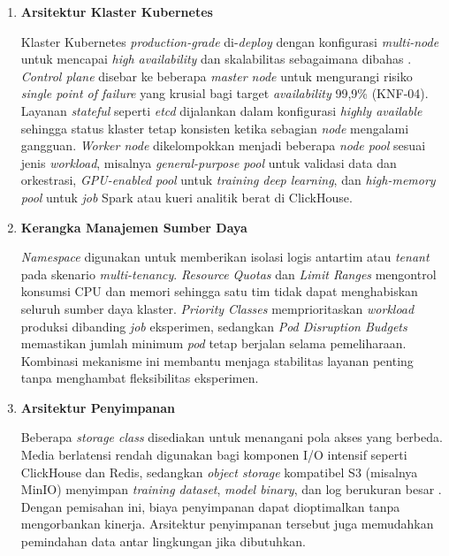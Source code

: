 \vspace{0.5em}
\begin{enumerate}
    \item \textbf{Arsitektur Klaster Kubernetes}  

    Klaster Kubernetes \textit{production-grade} di-\textit{deploy} dengan konfigurasi \textit{multi-node} untuk mencapai \textit{high availability} dan skalabilitas sebagaimana dibahas \textcite{lakka2025kubernetes}. \textit{Control plane} disebar ke beberapa \textit{master node} untuk mengurangi risiko \textit{single point of failure} yang krusial bagi target \textit{availability} 99{,}9\% (KNF-04). Layanan \textit{stateful} seperti \textit{etcd} dijalankan dalam konfigurasi \textit{highly available} sehingga status klaster tetap konsisten ketika sebagian \textit{node} mengalami gangguan. \textit{Worker node} dikelompokkan menjadi beberapa \textit{node pool} sesuai jenis \textit{workload}, misalnya \textit{general-purpose pool} untuk validasi data dan orkestrasi, \textit{GPU-enabled pool} untuk \textit{training} \textit{deep learning}, dan \textit{high-memory pool} untuk \textit{job} Spark atau kueri analitik berat di ClickHouse.

    \vspace{0.5em}

    \item \textbf{Kerangka Manajemen Sumber Daya}  

    \textit{Namespace} digunakan untuk memberikan isolasi logis antartim atau \textit{tenant} pada skenario \textit{multi-tenancy}. \textit{Resource Quotas} dan \textit{Limit Ranges} mengontrol konsumsi CPU dan memori sehingga satu tim tidak dapat menghabiskan seluruh sumber daya klaster. \textit{Priority Classes} memprioritaskan \textit{workload} produksi dibanding \textit{job} eksperimen, sedangkan \textit{Pod Disruption Budgets} memastikan jumlah minimum \textit{pod} tetap berjalan selama pemeliharaan. Kombinasi mekanisme ini membantu menjaga stabilitas layanan penting tanpa menghambat fleksibilitas eksperimen.

    \vspace{0.5em}

    \item \textbf{Arsitektur Penyimpanan}  

    Beberapa \textit{storage class} disediakan untuk menangani pola akses yang berbeda. Media berlatensi rendah digunakan bagi komponen I/O intensif seperti ClickHouse dan Redis, sedangkan \textit{object storage} kompatibel S3 (misalnya MinIO) menyimpan \textit{training dataset}, \textit{model binary}, dan log berukuran besar \autocite{kreuzberger2023mlops}. Dengan pemisahan ini, biaya penyimpanan dapat dioptimalkan tanpa mengorbankan kinerja. Arsitektur penyimpanan tersebut juga memudahkan pemindahan data antar lingkungan jika dibutuhkan.


\end{enumerate}
